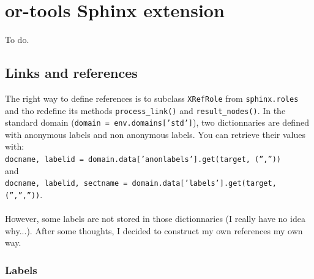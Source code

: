 \documentclass[a4paper,10pt]{article}
\newcommand{\code}[1]{\texttt{#1}}
\begin{document}

\section{or-tools Sphinx extension}

To do.

\subsection{Links and references}

The right way to define references is to subclass \code{XRefRole} from \code{sphinx.roles} and tho redefine its methods \code{process\_link()} and
\code{result\_nodes()}. In the standard domain (\code{domain = env.domains['std']}), two dictionnaries are defined with anonymous labels and non anonymous labels. You can 
retrieve their values with:\\

\code{docname, labelid = domain.data['anonlabels'].get(target, ('',''))}\\

and\\

\code{docname, labelid, sectname = domain.data['labels'].get(target, ('','',''))}.\\~\\

However, some labels are not stored in those dictionnaries (I really have no idea why...). After some thoughts, I decided to construct my own references my own way.

\subsubsection{Labels}
\end{document}
